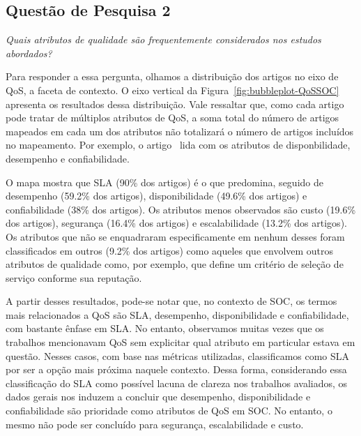\subsection{Quest\~{a}o de Pesquisa 2}
\emph{Quais atributos de qualidade são frequentemente considerados nos estudos abordados?}

Para responder a essa pergunta, olhamos a distribui\c{c}\~{a}o dos artigos no eixo de QoS, a faceta de contexto. O eixo vertical da Figura~\ref{fig:bubbleplot-QoSSOC} apresenta os resultados dessa distribui\c{c}\~{a}o. Vale ressaltar que, como cada artigo pode tratar de m\'{u}ltiplos atributos de QoS, a soma total do n\'{u}mero de artigos mapeados em cada um dos atributos n\~{a}o totalizar\'{a} o n\'{u}mero de artigos inclu\'{i}dos no mapeamento. Por exemplo, o artigo~\cite{DBLP:journals/tse/CalinescuGKMT11} lida com os atributos de disponbilidade, desempenho e confiabilidade. 

O mapa mostra que SLA (90\% dos artigos) \'{e} o que predomina, seguido de desempenho (59.2\% dos artigos), disponibilidade (49.6\% dos artigos) e confiabilidade (38\% dos artigos). Os atributos menos observados s\~{a}o custo (19.6\% dos artigos), seguran\c{c}a (16.4\% dos artigos) e escalabilidade (13.2\% dos artigos). Os atributos que n\~{a}o se enquadraram especificamente em nenhum desses foram classificados em outros (9.2\% dos artigos) como aqueles que envolvem outros atributos de qualidade como, por exemplo, \cite{6036406} que define um crit\'{e}rio de sele\c{c}\~{a}o de servi\c{c}o conforme sua reputa\c{c}\~{a}o. 

A partir desses resultados, pode-se notar que, no contexto de SOC, os termos mais relacionados a QoS s\~{a}o SLA, desempenho, disponibilidade e confiabilidade, com bastante \^{e}nfase em SLA. No entanto, observamos muitas vezes que os trabalhos mencionavam QoS sem explicitar qual atributo em particular estava em quest\~{a}o. Nesses casos, com base nas m\'{e}tricas utilizadas, classificamos como SLA por ser a op\c{c}\~{a}o mais pr\'{o}xima naquele contexto. Dessa forma, considerando essa classifica\c{c}\~{a}o do SLA como poss\'{i}vel lacuna de clareza nos trabalhos avaliados, os dados gerais nos induzem a concluir que desempenho, disponibilidade e confiabilidade s\~{a}o prioridade como atributos de QoS em SOC. No entanto, o mesmo n\~{a}o pode ser conclu\'{i}do para seguran\c{c}a, escalabilidade e custo. 